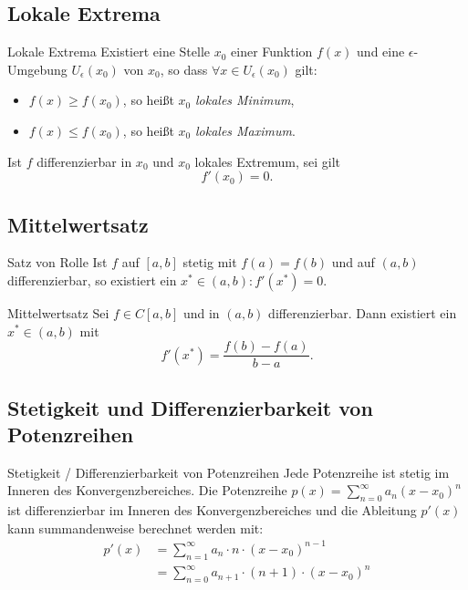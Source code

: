 \documentclass[german]{spicker}
\begin{document}
\subsection{Lokale Extrema}

\begin{defi}{Lokale Extrema}
    Existiert eine Stelle $x_0$ einer Funktion $f(x)$ und eine $\epsilon$-Umgebung $U_\epsilon (x_0)$ von $x_0$, so dass $\forall x \in U_\epsilon (x_0)$ gilt:
    \begin{itemize}
        \item $f(x) \geq f(x_0)$, so heißt $x_0$ \emph{lokales Minimum},
        \item $f(x) \leq f(x_0)$, so heißt $x_0$ \emph{lokales Maximum}.
    \end{itemize}

    Ist $f$ differenzierbar in $x_0$ und $x_0$ lokales Extremum, sei gilt
    $$
        f'(x_0) = 0.
    $$
\end{defi}

\subsection{Mittelwertsatz}

\begin{bonus}{Satz von Rolle}
    Ist $f$ auf $[a, b]$ stetig mit $f(a) = f(b)$ und auf $(a, b)$ differenzierbar, so existiert ein $x^* \in (a, b) : f'(x^*) = 0$.
\end{bonus}

\begin{defi}{Mittelwertsatz}
    Sei $f \in C[a, b]$ und in $(a, b)$ differenzierbar.
    Dann existiert ein $x^* \in (a, b)$ mit
    $$
        f'(x^*) = \frac{f(b)  -f(a)}{b-a}.
    $$
\end{defi}

\subsection{Stetigkeit und Differenzierbarkeit von Potenzreihen}

\begin{defi}{Stetigkeit / Differenzierbarkeit von Potenzreihen}
    Jede Potenzreihe ist stetig im Inneren des Konvergenzbereiches.
    Die Potenzreihe $p(x) = \sum^\infty_{n=0} a_n(x-x_0)^n$ ist differenzierbar im Inneren des Konvergenzbereiches und die Ableitung $p'(x)$ kann summandenweise berechnet werden mit:
    $$
        \begin{aligned}
            p'(x) & = \sum^\infty_{n=1} a_n \cdot n \cdot (x-x_0)^{n-1}       \\
                  & = \sum^\infty_{n=0} a_{n+1} \cdot (n+1) \cdot (x-x_0)^{n}
        \end{aligned}
    $$
\end{defi}
\end{document}
